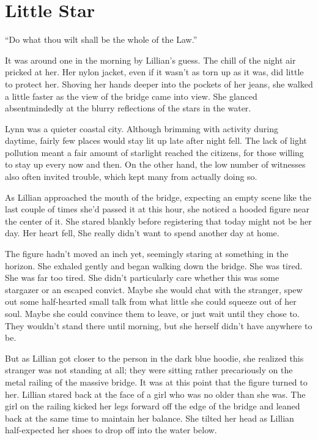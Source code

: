\chapter{Little Star}
\begin{ChapterNote}
``Do what thou wilt shall be the whole of the Law.''
\end{ChapterNote}
\begin{Standard}
It was around one in the morning by Lillian's guess. The chill of the night air
pricked at her. Her nylon jacket, even if it wasn't as torn up as it was, did little
to protect her. Shoving her hands deeper into the pockets of her jeans, she walked a
little faster as the view of the bridge came into view. She glanced absentmindedly
at the blurry reflections of the stars in the water.

Lynn was a quieter coastal city. Although brimming with activity during daytime,
fairly few places would stay lit up late after night fell. The lack of light pollution
meant a fair amount of starlight reached the citizens, for those willing to stay up
every now and then. On the other hand, the low number of witnesses also often invited
trouble, which kept many from actually doing so.

As Lillian approached the mouth of the bridge, expecting an empty scene like the last
couple of times she'd passed it at this hour, she noticed a hooded figure near the center
of it. She stared blankly before registering that today might not be her day. Her heart fell,
She really didn't want to spend another day at home.

The figure hadn't moved an inch yet, seemingly staring at something in the horizon.
She exhaled gently and began walking down the bridge. She was tired. She was far too tired.
She didn't particularly care whether this was some stargazer or an escaped convict.
Maybe she would chat with the stranger, spew out some half-hearted small talk from
what little she could squeeze out of her soul. Maybe she could convince them to leave, or just
wait until they chose to. They wouldn't stand there until morning, but she herself didn't
have anywhere to be.

But as Lillian got closer to the person in the dark blue hoodie, she realized this stranger
was not standing at all; they were sitting rather precariously on the metal railing of the
massive bridge. It was at this point that the figure turned to her. Lillian stared back at the
face of a girl who was no older than she was. The girl on the railing kicked her legs forward
off the edge of the bridge and leaned back at the same time to maintain her balance. She tilted
her head as Lillian half-expected her shoes to drop off into the water below.


\end{Standard}
